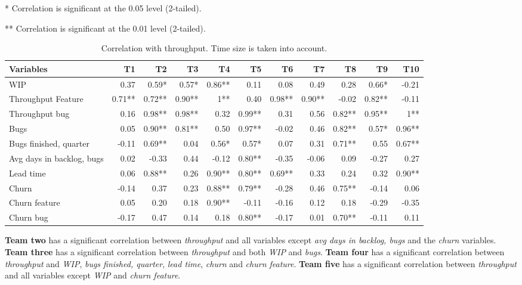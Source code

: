 \documentclass[UKenglish]{ifimaster}  %
\begin{document}
 \begin{table}[!htbp]
  \caption{Correlation with throughput. Time size is taken into account.}
 \centerline {* Correlation is significant at the 0.05 level (2-tailed).}
\centerline{** Correlation is significant at the 0.01 level (2-tailed).}
  \begin{adjustwidth}{-2.0cm}{}
 \centering
 \begin{tabular}{|l|r|r|r|r|r|r|r|r|r|r|}
\hline
 \textbf{Variables} & \bf{T1} & \bf{T2} & \bf{T3} & \bf{T4} & \bf{T5} & \bf{T6} & \bf{T7} & \bf{T8} & \bf{T9} & \bf{T10}\\ \hline
 WIP  & 0.37 & 0.59* & 0.57* & 0.86** & 0.11 & 0.08 & 0.49 & 0.28 & 0.66* & -0.21 \\ \hline
 Throughput Feature  & 0.71** & 0.72** & 0.90** & 1** & 0.40 & 0.98** & 0.90** & -0.02 & 0.82** & -0.11 \\ \hline
 Throughput bug  & 0.16 & 0.98** & 0.98** & 0.32 & 0.99** & 0.31 & 0.56 & 0.82** & 0.95** & 1** \\ \hline
 Bugs  & 0.05 & 0.90** & 0.81** & 0.50 & 0.97** & -0.02 & 0.46 & 0.82** & 0.57* & 0.96** \\ \hline
 Bugs finished, quarter  & -0.11 & 0.69** & 0.04 & 0.56* & 0.57* & 0.07 & 0.31 & 0.71** & 0.55 & 0.67** \\ \hline
 Avg days in backlog, bugs  & 0.02 & -0.33 & 0.44 & -0.12 & 0.80** & -0.35 & -0.06 & 0.09 & -0.27 & 0.27 \\ \hline
 Lead time  & 0.06 & 0.88** & 0.26 & 0.90** & 0.80** & 0.69** & 0.33 & 0.24 & 0.32 & 0.90** \\ \hline
 Churn  & -0.14 & 0.37 & 0.23 & 0.88** & 0.79** & -0.28 & 0.46 & 0.75** & -0.14 & 0.06 \\ \hline
 Churn feature  & 0.05 & 0.20 & 0.18 & 0.90** & -0.11 & -0.16 & 0.12 & 0.18 & -0.29 & -0.35 \\ \hline
 Churn bug  & -0.17 & 0.47 & 0.14 & 0.18 & 0.80** & -0.17 & 0.01 & 0.70** & -0.11 & 0.11 \\ \hline
\end{tabular}
 \label{corr:TP:V2}
\end{adjustwidth}
\end{table}
\newpage 
 
 \textbf{Team two} has a significant correlation between \textit{throughput} and all variables except \textit{avg days in backlog, bugs} and the \textit{churn} variables.  \textbf{Team three} has a significant correlation between \textit{throughput} and both \textit{WIP} and \textit{bugs}. \textbf{Team four} has a significant correlation  between \textit{throughput} and \textit{WIP}, \textit{bugs finished, quarter}, \textit{lead time}, \textit{churn} and \textit{churn feature}. \textbf{Team five} has a significant correlation  between \textit{throughput} and all variables except \textit{WIP} and \textit{churn feature}. 
\end{document}
